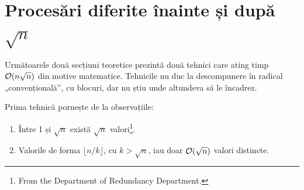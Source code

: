 \documentclass[../main.tex]{subfiles}
\begin{document}
\section{Procesări diferite înainte și după \texorpdfstring{$\sqrt{n}$}{sqrt(n)}}
\label{sec:sqrt-split}

Următoarele două secțiuni teoretice prezintă două tehnici care ating timp $\mathcal{O}(n \sqrt{n})$ din motive matematice. Tehnicile nu duc la descompunere în radical „convențională”, cu blocuri, dar nu știu unde altundeva să le încadrez.

Prima tehnică pornește de la observațiile:

\begin{enumerate}
  \item Între 1 și $\sqrt{n}$ există $\sqrt{n}$ valori\footnote{From the Department of Redundancy Department.}.
  \item Valorile de forma $\lfloor n / k \rfloor$, cu $k > \sqrt{n}$, iau doar $\mathcal{O}(\sqrt{n})$ valori distincte.
\end{enumerate}
\end{document}
